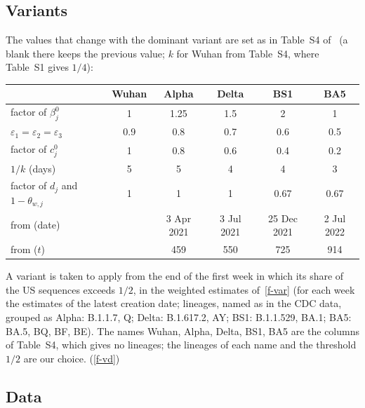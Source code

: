 \documentclass[11pt]{article}
\theoremstyle{remark}
\newcommand{\fref}[1]{\ref{#1}}
\begin{document}
\subsection{Variants}\label{sec-var}

The values that change with the dominant variant are set as in Table~S4
of~\cite{2026Feng_Day_Glasser} (a blank there keeps the previous value; $k$ for
Wuhan from Table~S4, where Table~S1 gives $1/4$):
\begin{center}
\small
\begin{tabular}{lccccc}
 & Wuhan & Alpha & Delta & BS1 & BA5\\\hline
factor of $\beta_j^0$ & 1 & 1.25 & 1.5 & 2 & 1\\
$\varepsilon_1=\varepsilon_2=\varepsilon_3$ & 0.9 & 0.8 & 0.7 & 0.6 & 0.5\\
factor of $c_j^0$ & 1 & 0.8 & 0.6 & 0.4 & 0.2\\
$1/k$ (days) & 5 & 5 & 4 & 4 & 3\\
factor of $d_j$ and $1-\theta_{w,j}$ & 1 & 1 & 1 & 0.67 & 0.67\\\hline
from (date) & & 3 Apr 2021 & 3 Jul 2021 & 25 Dec 2021 & 2 Jul 2022\\
from ($t$) & & 459 & 550 & 725 & 914
\end{tabular}
\end{center}
A variant is taken to apply from the end of the first week in which its share of
the US sequences exceeds $1/2$, in the weighted estimates of~\fref{f-var} (for
each week the estimates of the latest creation date; lineages, named as in the CDC data,
grouped as Alpha: B.1.1.7, Q; Delta: B.1.617.2, AY; BS1: B.1.1.529, BA.1; BA5: BA.5, BQ,
BF, BE). The names Wuhan, Alpha, Delta, BS1, BA5 are the columns of Table~S4, which
gives no lineages; the lineages of each name and the threshold $1/2$ are our choice.
(\fref{f-vd})

\subsection{Data}\label{sec-inputs}
\end{document}
